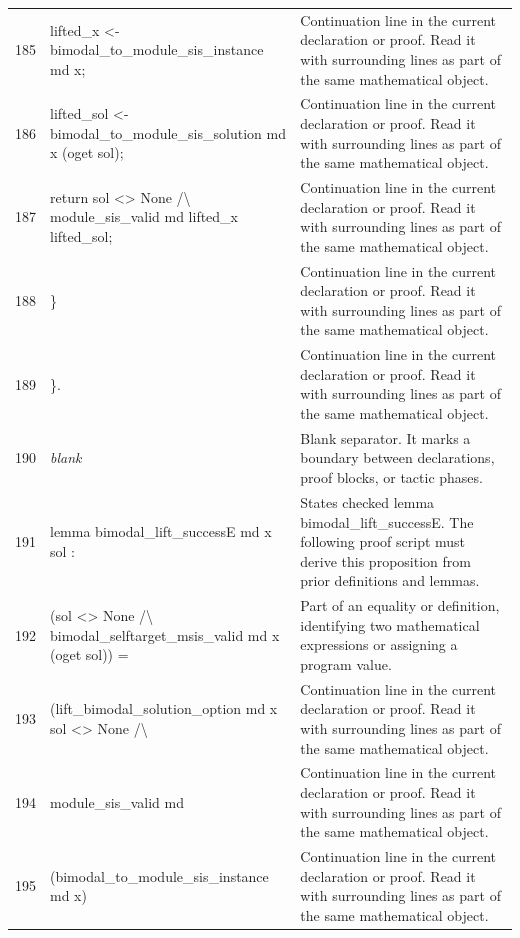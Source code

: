 \documentclass[10pt]{article}
\begin{document}
\begin{longtable}{r L{0.53\textwidth} L{0.37\textwidth}}
185 & {\ttfamily\scriptsize     lifted\_x <- bimodal\_to\_module\_sis\_instance md x;} & Continuation line in the current declaration or proof.  Read it with surrounding lines as part of the same mathematical object. \\
186 & {\ttfamily\scriptsize     lifted\_sol <- bimodal\_to\_module\_sis\_solution md x (oget sol);} & Continuation line in the current declaration or proof.  Read it with surrounding lines as part of the same mathematical object. \\
187 & {\ttfamily\scriptsize     return sol <> None /\textbackslash{} module\_sis\_valid md lifted\_x lifted\_sol;} & Continuation line in the current declaration or proof.  Read it with surrounding lines as part of the same mathematical object. \\
188 & {\ttfamily\scriptsize   \}} & Continuation line in the current declaration or proof.  Read it with surrounding lines as part of the same mathematical object. \\
189 & {\ttfamily\scriptsize \}.} & Continuation line in the current declaration or proof.  Read it with surrounding lines as part of the same mathematical object. \\
190 & {\ttfamily\scriptsize \emph{blank}} & Blank separator.  It marks a boundary between declarations, proof blocks, or tactic phases. \\
191 & {\ttfamily\scriptsize lemma bimodal\_lift\_successE md x sol :} & States checked lemma bimodal\_lift\_successE.  The following proof script must derive this proposition from prior definitions and lemmas. \\
192 & {\ttfamily\scriptsize   (sol <> None /\textbackslash{} bimodal\_selftarget\_msis\_valid md x (oget sol)) =} & Part of an equality or definition, identifying two mathematical expressions or assigning a program value. \\
193 & {\ttfamily\scriptsize   (lift\_bimodal\_solution\_option md x sol <> None /\textbackslash{}} & Continuation line in the current declaration or proof.  Read it with surrounding lines as part of the same mathematical object. \\
194 & {\ttfamily\scriptsize    module\_sis\_valid md} & Continuation line in the current declaration or proof.  Read it with surrounding lines as part of the same mathematical object. \\
195 & {\ttfamily\scriptsize      (bimodal\_to\_module\_sis\_instance md x)} & Continuation line in the current declaration or proof.  Read it with surrounding lines as part of the same mathematical object. \\

\end{longtable}
\end{document}
